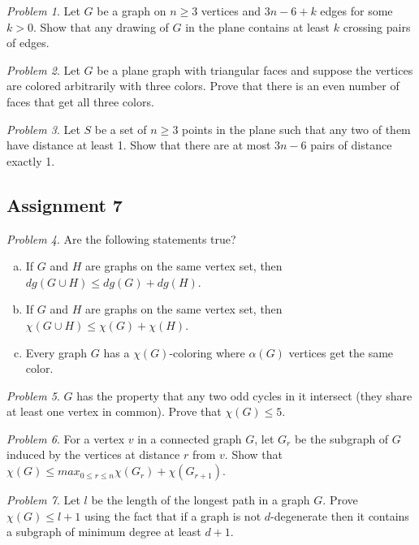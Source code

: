 \documentclass[11pt, fleqn, a4paper, landscape]{article}
\theoremstyle{plain} %
\theoremstyle{remark} %
\newtheorem{problem}{Problem}
\theoremstyle{definition} %
\begin{document}
\begin{multicols}{3}
\begin{problem}
Let $G$ be a graph on $n\ge 3$ vertices and $3n- 6 + k$ edges for some $k > 0$. Show that any drawing of $G$ in the plane contains at least $k$ crossing pairs of edges.
\end{problem}

\begin{problem}
Let $G$ be a plane graph with triangular faces and suppose the vertices are colored arbitrarily with three colors. Prove that there is an even number of faces that get all three colors.
\end{problem}

\begin{problem}
Let $S$ be a set of $n\ge 3$ points in the plane such that any two of them have distance at least 1. Show that there are at most $3n - 6$ pairs of distance exactly 1.
\end{problem}

\subsection{Assignment 7}

\begin{problem}
Are the following statements true?
\begin{enumerate}[(a)]
\item If $G$ and $H$ are graphs on the same vertex set, then $dg(G \cup H)\le dg(G) + dg(H)$.
\item If $G$ and $H$ are graphs on the same vertex set, then $\chi(G \cup H) \le \chi(G) + \chi(H)$.
\item Every graph $G$ has a $\chi(G)$-coloring where $\alpha(G)$ vertices get the same color.
\end{enumerate}
\end{problem}

\begin{problem}
$G$ has the property that any two odd cycles in it intersect (they share at least one vertex in common). Prove that $\chi(G) \le 5.$
\end{problem}

\begin{problem}
For a vertex $v$ in a connected graph $G$, let $G_r$ be the subgraph of $G$ induced by the vertices at distance $r$ from $v$. Show that $\chi(G) \le max_{0\le r\le n}\chi(G_r) + \chi(G_{r+1})$.
\end{problem}

\begin{problem}
Let $l$ be the length of the longest path in a graph $G$. Prove $\chi(G)\le l + 1$ using the fact that if a graph is not $d$-degenerate then it contains a subgraph of minimum degree at least $d + 1$.
\end{problem}


\end{multicols}
\end{document}
